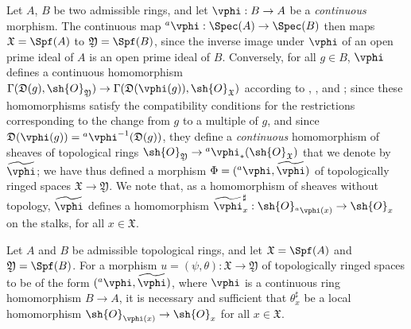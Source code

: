 \begin{env}[10.2.1]
\label{I.10.2.1}
Let $A$, $B$ be two admissible rings, and let $\vphi:B\to A$ be a \emph{continuous} morphism.
The continuous map ${}^a\vphi:\Spec(A)\to\Spec(B)$  then maps $\mathfrak{X}=\Spf(A)$ to $\mathfrak{Y}=\Spf(B)$, since the inverse image under $\vphi$ of an open prime ideal of $A$ is an open prime ideal of $B$.
Conversely, for all $g\in B$, $\vphi$ defines a continuous homomorphism $\Gamma(\mathfrak{D}(g),\sh{O}_\mathfrak{Y})\to\Gamma(\mathfrak{D}(\vphi(g)),\sh{O}_\mathfrak{X})$ according to , , and ;
since these homomorphisms satisfy the compatibility conditions for the restrictions corresponding to the change from $g$ to a multiple of $g$, and since $\mathfrak{D}(\vphi(g))={}^a\vphi^{-1}(\mathfrak{D}(g))$, they define a \emph{continuous} homomorphism of sheaves of topological rings $\sh{O}_\mathfrak{Y}\to{}^a\vphi_*(\sh{O}_\mathfrak{X})$  that we denote by $\widetilde{\vphi}$;
we have thus defined a morphism $\Phi=({}^a\vphi,\widetilde{\vphi})$ of topologically ringed spaces $\mathfrak{X}\to\mathfrak{Y}$.
We note that, as a homomorphism of sheaves without topology, $\widetilde{\vphi}$ defines a homomorphism $\widetilde{\vphi}_x^\sharp:\sh{O}_{{}^a\vphi(x)}\to\sh{O}_x$ on the stalks, for all $x\in\mathfrak{X}$.
\end{env}

\begin{proposition}[10.2.2]
\label{I.10.2.2}
Let $A$ and $B$ be admissible topological rings, and let $\mathfrak{X}=\Spf(A)$ and $\mathfrak{Y}=\Spf(B)$.
For a morphism $u=(\psi,\theta):\mathfrak{X}\to\mathfrak{Y}$ of topologically ringed spaces to be of the form $({}^a\vphi,\widetilde{\vphi})$, where $\vphi$ is a continuous ring homomorphism $B\to A$, it is necessary and sufficient that $\theta_x^\sharp$ be a local homomorphism $\sh{O}_{\vphi(x)}\to\sh{O}_x$ for all $x\in\mathfrak{X}$.
\end{proposition}

